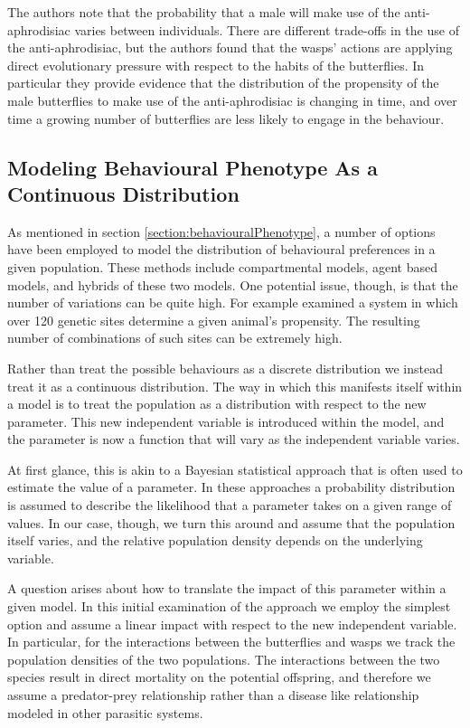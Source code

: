 \documentclass[review,authoryear]{elsarticle}
\begin{document}
The authors \cite{10.1093/beheco/arq007} note that the probability that
a male will make use of the anti-aphrodisiac varies between
individuals. There are different trade-offs in the use of the
anti-aphrodisiac, but the authors found that the wasps' actions are
applying direct evolutionary pressure with respect to the habits of
the butterflies. In particular they provide evidence that the
distribution of the propensity of the male butterflies to make use of
the anti-aphrodisiac is changing in time, and over time a growing
number of butterflies are less likely to engage in the behaviour.

\subsection{Modeling Behavioural Phenotype As a Continuous
  Distribution}

As mentioned in section \ref{section:behaviouralPhenotype}, a number
of options have been employed to model the distribution of behavioural
preferences in a given population. These methods include compartmental
models, agent based models, and hybrids of these two models. One
potential issue, though, is that the number of variations can be quite
high. For example \cite{doi:10.1111/mec.14878} examined a system in
which over 120 genetic sites determine a given animal's
propensity. The resulting number of
combinations of such sites can be extremely high.

Rather than treat the possible behaviours as a discrete distribution
we instead treat it as a continuous distribution. The way in which
this manifests itself within a model is to treat the population as a
distribution with respect to the new parameter. This new independent
variable is introduced within the model, and the parameter is now a
function that will vary as the independent variable varies.

At first glance, this is akin to a Bayesian statistical approach that
is often used to estimate the value of a
parameter\citep{doi:10.1111/j.1467-9868.2007.00610.x,Fitzpatrick_1991}. In
these approaches a probability distribution is assumed to describe the
likelihood that a parameter takes on a given range of values. In our
case, though, we turn this around and assume that the population
itself varies, and the relative population density depends on the
underlying variable.

A question arises about how to translate the impact of this parameter
within a given model. In this initial examination of the approach we
employ the simplest option and assume a linear impact with respect to
the new independent variable. In particular, for the interactions
between the butterflies and wasps we track the population densities of
the two populations. The interactions between the two species result
in direct mortality on the potential offspring, and therefore we assume a
predator-prey relationship rather than a disease like relationship
modeled in other parasitic systems. 
\end{document}
